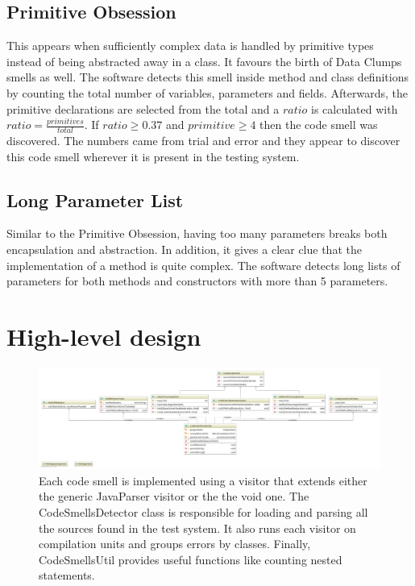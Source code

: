 \documentclass[a4paper]{article}
\begin{document}
\subsection{Primitive Obsession}
This appears when sufficiently complex data is handled by primitive types
instead of being abstracted away in a class.
It favours the birth of Data Clumps smells as well.
The software detects this smell inside method and class
definitions by
counting the total number of variables, parameters and fields.
Afterwards, the primitive declarations are selected from the total and a $ratio$
is calculated with $ratio=\frac{primitives}{total}$.
If $ratio \geq 0.37$ and $primitive \geq 4$ then the code smell was discovered.
The numbers came from trial and error and they appear to discover this
code smell wherever it is present in the testing system.

\subsection{Long Parameter List}
Similar to the Primitive Obsession, having too many parameters breaks both
encapsulation and abstraction.
In addition, it gives a clear clue that the implementation
of a method is quite complex.
The software detects long lists of parameters for both methods and constructors
with more than 5 parameters.

\section{High-level design}

\begin{figure}
	\includegraphics[width=\textwidth]{codesmellspng}
	\caption{Each code smell is implemented using a visitor that extends either
		the generic JavaParser visitor or the the void one.
		The CodeSmellsDetector class is responsible for loading and parsing all
		the sources found in the test system.
		It also runs each visitor on compilation units and
		groups errors by classes.
		Finally, CodeSmellsUtil provides useful functions like counting
		nested statements.}
\end{figure}
\end{document}
